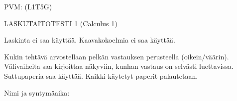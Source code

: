 \documentclass[finnish, a4paper, 12pt]{article}
\begin{document}
	
	
		PVM: \underline{\phantom{mm.mm.}}
		\hfill
		(L1T5G)	%
	
	\begin{center}
		{\large
			LASKUTAITOTESTI 1 (Calculus 1)}
	\end{center}
	
	Laskinta ei saa käyttää. Kaavakokoelmia ei saa käyttää.
	
	Kukin tehtävä arvostellaan pelkän vastauksen perusteella (oikein/väärin).
	Välivaiheita saa kirjoittaa näkyviin, kunhan vastaus on selvästi luettavissa.
	Suttupaperia saa käyttää. Kaikki käytetyt paperit palautetaan.
	
\vspace{12pt}
Nimi ja syntymäaika: \phantom{m} \hrulefill
\vspace{8pt}
	
\end{document}
